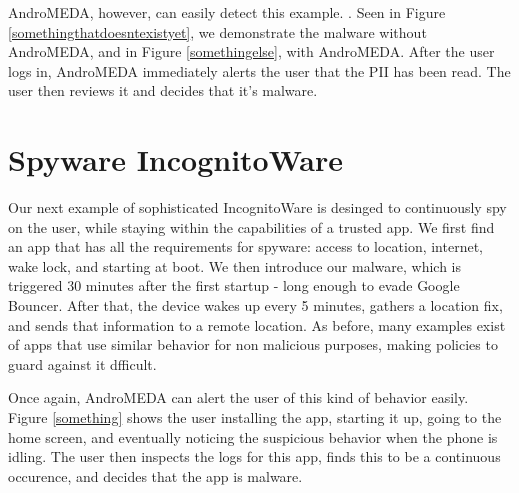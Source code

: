 AndroMEDA, however, can easily detect this example. . Seen in Figure \ref{somethingthatdoesntexistyet}, we demonstrate the malware without AndroMEDA, and in Figure \ref{somethingelse}, with AndroMEDA. After the user logs in, AndroMEDA immediately alerts the user that the PII has been read. The user then reviews it and decides that it's malware.

\section{Spyware IncognitoWare}
Our next example of sophisticated IncognitoWare is desinged to continuously spy on the user, while staying within the capabilities of a trusted app. We first find an app that has all the requirements for spyware: access to location, internet, wake lock, and starting at boot. We then introduce our malware, which is triggered 30 minutes after the first startup - long enough to evade Google Bouncer\citep{mansfield2012android}. After that, the device wakes up every 5 minutes, gathers a location fix, and sends that information to a remote location. As before, many examples exist of apps that use similar behavior for non malicious purposes, making policies to guard against it dfficult.

Once again, AndroMEDA can alert the user of this kind of behavior easily. Figure \ref{something} shows the user installing the app, starting it up, going to the home screen, and eventually noticing the suspicious behavior when the phone is idling. The user then inspects the logs for this app, finds this to be a continuous occurence, and decides that the app is malware.




